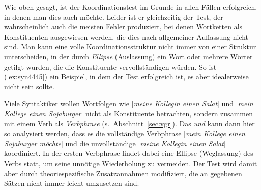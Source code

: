\begin{exe}
  \ex\label{ex:syn4444}
  \begin{xlist}
    \begin{xlist}
    \end{xlist}
  \end{xlist}
\end{exe}

Wie oben gesagt, ist der Koordinationstest im Grunde in allen Fällen erfolgreich, in denen man dies auch möchte.
Leider ist er gleichzeitig der Test, der wahrscheinlich auch die meisten Fehler produziert, bei denen Wortketten als Konstituenten ausgewiesen werden, die dies nach allgemeiner Auffassung nicht sind.
Man kann eine volle Koordinationsstruktur nicht immer von einer Struktur unterscheiden, in der durch \textit{Ellipse} (Auslassung) ein Wort oder mehrere Wörter getilgt wurden, die die Konstituente vervollständigen würden.
So ist \zB (\ref{ex:syn4445}) ein Beispiel, in dem der Test erfolgreich ist, es aber idealerweise nicht sein sollte.

\begin{sloppypar}
\begin{exe}
\end{exe}
\end{sloppypar}

Viele Syntaktiker wollen Wortfolgen wie [\textit{meine Kollegin einen Salat}] und [\textit{mein Kollege einen Sojaburger}] nicht als Konstituente betrachten, sondern zusammen mit einem Verb als \textit{Verbphrase} (s.\ Abschnitt~\ref{sec:vgr}).
Das \textit{und} kann dann hier so analysiert werden, dass es die vollständige Verbphrase [\textit{mein Kollege einen Sojaburger möchte}] und die unvollständige [\textit{meine Kollegin einen Salat}] koordiniert.
In der ersten Verbphrase findet dabei eine Ellipse (Weglassung) des Verbs statt, um seine unnötige Wiederholung zu vermeiden.
Der Test wird damit aber durch theoriespezifische Zusatzannahmen modifiziert, die an gegebenen Sätzen nicht immer leicht umzusetzen sind.

